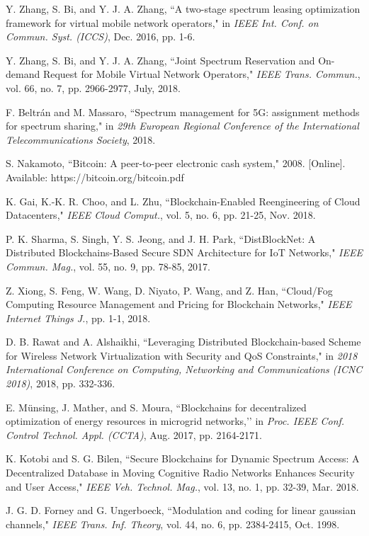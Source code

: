 \documentclass[journal]{IEEEtran}
\begin{document}
\begin{thebibliography}{1}
Y. Zhang, S. Bi, and Y. J. A. Zhang, ``A two-stage spectrum leasing optimization framework for virtual mobile network operators," in \emph{IEEE Int. Conf. on Commun. Syst. (ICCS)}, Dec. 2016, pp. 1-6.

Y. Zhang, S. Bi, and Y. J. A. Zhang, ``Joint Spectrum Reservation and On-demand Request for Mobile Virtual Network Operators," \emph{IEEE Trans. Commun.}, vol. 66, no. 7, pp. 2966-2977, July, 2018.	

F. Beltr{\'a}n and M. Massaro, ``Spectrum management for 5G: assignment methods for spectrum sharing," in \emph{29th European Regional Conference of the International Telecommunications Society}, 2018.

S. Nakamoto, ``Bitcoin: A peer-to-peer electronic cash system," 2008. [Online]. Available: https://bitcoin.org/bitcoin.pdf

K. Gai, K.-K. R. Choo, and L. Zhu, ``Blockchain-Enabled Reengineering of Cloud Datacenters," \emph{IEEE Cloud Comput.}, vol. 5, no. 6, pp. 21-25, Nov. 2018.

P. K. Sharma, S. Singh, Y. S. Jeong, and J. H. Park, ``DistBlockNet: A Distributed Blockchains-Based Secure SDN Architecture for IoT Networks," \emph{IEEE Commun. Mag.}, vol. 55, no. 9, pp. 78-85, 2017.

Z. Xiong, S. Feng, W. Wang, D. Niyato, P. Wang, and Z. Han, ``Cloud/Fog Computing Resource Management and Pricing for Blockchain Networks," \emph{IEEE Internet Things J.}, pp. 1-1, 2018.

D. B. Rawat and A. Alshaikhi, ``Leveraging Distributed Blockchain-based Scheme for Wireless Network Virtualization with Security and QoS Constraints," in \emph{2018 International Conference on Computing, Networking and Communications (ICNC 2018)}, 2018, pp. 332-336.

E. M\"{u}nsing, J. Mather, and S. Moura, ``Blockchains for decentralized optimization of energy resources in microgrid networks,’’ in \emph{Proc. IEEE
Conf. Control Technol. Appl. (CCTA)}, Aug. 2017, pp. 2164-2171.

K. Kotobi and S. G. Bilen, ``Secure Blockchains for Dynamic Spectrum Access: A Decentralized Database in Moving Cognitive Radio Networks Enhances Security and User Access," \emph{IEEE Veh. Technol. Mag.}, vol. 13, no. 1, pp. 32-39, Mar. 2018.
	
J. G. D. Forney and G. Ungerboeck, ``Modulation and coding for linear gaussian channels," \emph{IEEE Trans. Inf. Theory}, vol. 44, no. 6, pp. 2384-2415, Oct. 1998.


\end{thebibliography}
\end{document}
